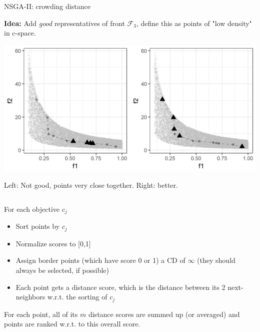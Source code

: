 \begin{frame}[allowframebreaks]{NSGA-II: crowding distance}

\textbf{Idea:} Add \textit{good} representatives of front $\mathcal{F}_3$, define this as points of "low density" in c-space.

\begin{center}
\includegraphics[height = 0.6\textheight]{images/NSGA2_CS1.png}
\end{center}

Left: Not good, points very close together. Right: better.

\framebreak


\begin{columns}
\begin{column}{0.5\textwidth}
For each objective $c_j$
\begin{itemize}
\item Sort points by $c_j$
\item Normalize scores to [0,1]
\item Assign border points (which have score 0 or 1) a CD of $\infty$ (they should always be selected, if possible)
\item Each point gets a distance score, which is the distance between its 2 next-neighbors w.r.t. the sorting of $c_j$
\end{itemize}
For each point, all of its $m$ distance scores are summed up (or averaged) and points are ranked w.r.t. to this overall score.
\end{column}


\end{columns}
\end{frame}
